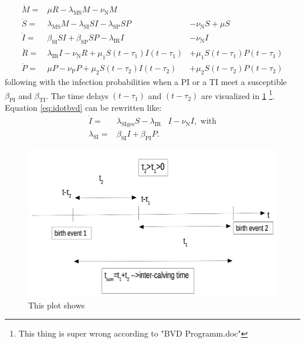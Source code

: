 \begin{eqnarray}
\dot{M}  =& \mu R-\lambda_\text{MS} M -\nu_\text{N} M & \\
\dot{S}  =& \lambda_\text{MS} M - \lambda_\text{SI}SI-\lambda_\text{SP} SP &-\nu_\text{N} S + \mu S \\
\dot{I}  =& \beta_\text{SI}SI+\beta_\text{SP} SP - \lambda_\text{IR} I &- \nu_\text{N} I \label{eq:idotbvd} \\
\dot{R}  =& \lambda_\text{IR}I - \nu_\text{N} R +\mu_1S(t-\tau_1)I(t-\tau_1) &+\mu_1S(t-\tau_1)P(t-\tau_1) \\ 
\dot{P}  =&  \mu P -\nu_\text{P}P + \mu_2S(t-\tau_2)I(t-\tau_2) &+ \mu_2S(t-\tau_2)P(t-\tau_2)
\end{eqnarray}
following \citep{BAS16} with the infection probabilities when a PI or a TI meet a susceptible $\beta_\text{PI}$ and $\beta_\text{TI}$. The time delays $(t-\tau_1)$ and $(t-\tau_2)$ are visualized in \ref{fig:infectionTimeScale} 
\footnote{This thing is super wrong according to "BVD Programm.doc"}. Equation \ref{eq:idotbvd} can be rewritten like:
\begin{eqnarray}
\dot{I}  =& \lambda_\text{SIges}S - \lambda_\text{IR}&I - \nu_\text{N} I, \text{ with} \\
\lambda_\text{SI} =& \beta_\text{SI} I+ \beta_\text{PI} P.& \label{eq:vie04start}
\end{eqnarray}
 
\begin{figure}[htbp]
\centering
\noindent\includegraphics[width=\linewidth,height=\textheight,
keepaspectratio]{infectionTimeScale.png} \caption[]{This plot shows }
\label{fig:infectionTimeScale}
\end{figure}
